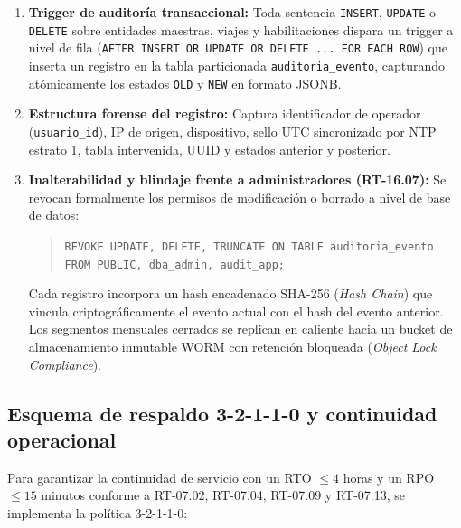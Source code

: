 \begin{enumerate}
    \item \textbf{Trigger de auditoría transaccional:} Toda sentencia \texttt{INSERT}, \texttt{UPDATE} o \texttt{DELETE} sobre entidades maestras, viajes y habilitaciones dispara un trigger a nivel de fila (\texttt{AFTER INSERT OR UPDATE OR DELETE ... FOR EACH ROW}) que inserta un registro en la tabla particionada \texttt{auditoria\_evento}, capturando atómicamente los estados \texttt{OLD} y \texttt{NEW} en formato JSONB.
    \item \textbf{Estructura forense del registro:} Captura identificador de operador (\texttt{usuario\_id}), IP de origen, dispositivo, sello UTC sincronizado por NTP estrato 1, tabla intervenida, UUID y estados anterior y posterior.
    \item \textbf{Inalterabilidad y blindaje frente a administradores (RT-16.07):} Se revocan formalmente los permisos de modificación o borrado a nivel de base de datos:
    \begin{quote}
    \small\texttt{REVOKE UPDATE, DELETE, TRUNCATE ON TABLE auditoria\_evento FROM PUBLIC, dba\_admin, audit\_app;}
    \end{quote}
    Cada registro incorpora un hash encadenado SHA-256 (\textit{Hash Chain}) que vincula criptográficamente el evento actual con el hash del evento anterior. Los segmentos mensuales cerrados se replican en caliente hacia un bucket de almacenamiento inmutable WORM con retención bloqueada (\textit{Object Lock Compliance}).
\end{enumerate}

\subsection{Esquema de respaldo 3-2-1-1-0 y continuidad operacional}

Para garantizar la continuidad de servicio con un RTO $\le 4$ horas y un RPO $\le 15$ minutos conforme a RT-07.02, RT-07.04, RT-07.09 y RT-07.13, se implementa la política 3-2-1-1-0:

